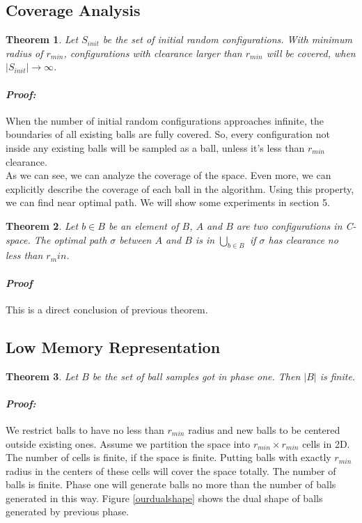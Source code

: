 \documentclass[11pt]{article}
\newtheorem{theorem}{Theorem}[section]
\begin{document}
  \subsection{Coverage Analysis}
  \begin{theorem}
  Let $S_{init}$ be the set of initial random configurations. With minimum radius of $r_{min}$, configurations with clearance larger than $r_{min}$ will be covered, when $|S_{init}| \rightarrow \infty$.
  \end{theorem}
    
  \paragraph{\emph{Proof:}} 
  \indent When the number of initial random configurations approaches infinite, the boundaries of all existing balls are fully covered. So, every configuration not inside any existing balls will be sampled as a ball, unless it's less than $r_{min}$ clearance.\\
  
  As we can see, we can analyze the coverage of the space. Even more, we can explicitly describe the coverage of each ball in the algorithm. Using this property, we can find near optimal path. We will show some experiments in section 5.
  
  \begin{theorem}
  Let $b \in B$ be an element of $B$, $A$ and $B$ are two configurations in \emph{C-space}. The optimal path $\sigma$ between $A$ and $B$ is in $\bigcup_{b\in B}$ if $\sigma$ has clearance no less than $r_min$. 
  \end{theorem}   
  \paragraph{\emph{Proof}}
  \indent This is a direct conclusion of previous theorem.

  \subsection{Low Memory Representation}  
  \begin{theorem}
  Let $B$ be the set of ball samples got in phase one. Then $|B|$ is finite.   
  \end{theorem}
  \paragraph{\emph{Proof:}} 
  \indent We restrict balls to have no less than $r_{min}$ radius and new balls to be centered outside existing ones. Assume we partition the space into $r_{min} \times r_{min}$ cells in 2D. The number of cells is finite, if the space is finite. Putting balls with exactly $r_{min}$ radius in the centers of these cells will cover the space totally. The number of balls is finite. Phase one will generate balls no more than the number of balls generated in this way. Figure \ref{ourdualshape} shows the dual shape of balls generated by previous phase.  \\
  
\end{document}
